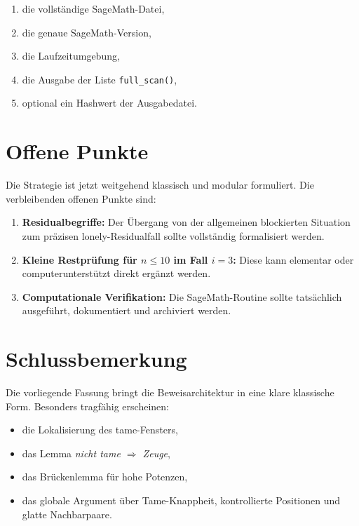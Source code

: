 \documentclass[12pt,a4paper]{article}
\theoremstyle{plain}
\theoremstyle{definition}
\theoremstyle{remark}
\begin{document}
	\begin{enumerate}[label=\arabic*)]
		\item die vollständige SageMath-Datei,
		\item die genaue SageMath-Version,
		\item die Laufzeitumgebung,
		\item die Ausgabe der Liste \texttt{full\_scan()},
		\item optional ein Hashwert der Ausgabedatei.
	\end{enumerate}
	
	\section{Offene Punkte}
	
	Die Strategie ist jetzt weitgehend klassisch und modular formuliert. Die verbleibenden offenen Punkte sind:
	
	\begin{enumerate}[label=\arabic*)]
		\item \textbf{Residualbegriffe:}  
		Der Übergang von der allgemeinen blockierten Situation zum präzisen lonely-Residualfall sollte vollständig formalisiert werden.
		
		\item \textbf{Kleine Restprüfung für \(n\le10\) im Fall \(i=3\):}  
		Diese kann elementar oder computerunterstützt direkt ergänzt werden.
		
		\item \textbf{Computationale Verifikation:}  
		Die SageMath-Routine sollte tatsächlich ausgeführt, dokumentiert und archiviert werden.
	\end{enumerate}
	
	\section{Schlussbemerkung}
	
	Die vorliegende Fassung bringt die Beweisarchitektur in eine klare klassische Form. Besonders tragfähig erscheinen:
	
	\begin{itemize}
		\item die Lokalisierung des tame-Fensters,
		\item das Lemma \emph{nicht tame \(\Rightarrow\) Zeuge},
		\item das Brückenlemma für hohe Potenzen,
		\item das globale Argument über Tame-Knappheit, kontrollierte Positionen und glatte Nachbarpaare.
	\end{itemize}
	
\end{document}
